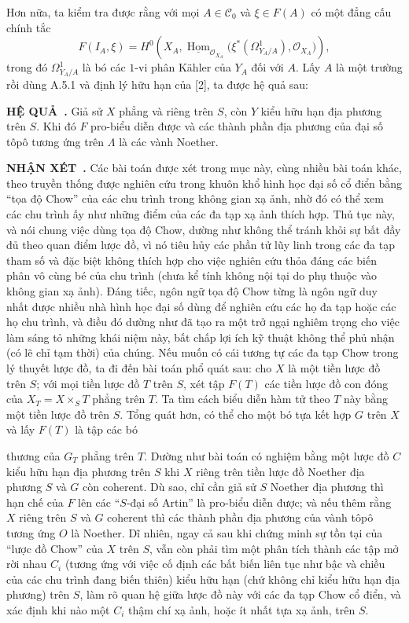 \documentclass[11pt,twoside,openany]{book}
\numberwithin{equation}{section}
\newcommand{\src}[1]{%
  \phantomsection\hypertarget{src:\fgasourceid:#1}{}%
  \marginpar{\raggedleft\footnotesize\sffamily #1}%
}
\newcommand{\fgasourceid}{unset}
\newcommand{\result}[2]{\par\medskip\noindent\textbf{#1\if\relax\detokenize{#2}\relax\else\ #2\fi.}\quad}
\begin{document}
Hơn nữa, ta kiểm tra được rằng với mọi $A\in\mathcal C_0$ và $\xi\in F(A)$ có
một đẳng cấu chính tắc
\[
  F(I_A,\xi)=H^0\!\left(
    X_A,
    \underline{\operatorname{Hom}}_{\mathcal O_{X_A}}
    \bigl(\xi^*(\Omega^1_{Y_A/A}),\mathcal O_{X_A}\bigr)
  \right),
\]
trong đó $\Omega^1_{Y_A/A}$ là bó các $1$-vi phân Kähler của $Y_A$ đối với
$A$. Lấy $A$ là một trường rồi dùng A.5.1 và định lý hữu hạn của [2], ta được
hệ quả sau:

\result{HỆ QUẢ}{} Giả sử $X$ phẳng và riêng trên $S$, còn $Y$ kiểu hữu hạn địa
phương trên $S$. Khi đó $F$ pro-biểu diễn được và các thành phần địa phương của
đại số tôpô tương ứng trên $\Lambda$ là các vành Noether.

\result{NHẬN XÉT}{} Các bài toán được xét trong mục này, cùng nhiều bài toán
khác, theo truyền thống được nghiên cứu trong khuôn khổ hình học đại số cổ điển
bằng ``tọa độ Chow'' của các chu trình trong không gian xạ ảnh, nhờ đó có thể
xem các chu trình ấy như những điểm của các đa tạp xạ ảnh thích hợp. Thủ tục
này, và nói chung việc dùng tọa độ Chow, dường như không thể tránh khỏi sự bất
đầy đủ theo quan điểm lược đồ, vì nó tiêu hủy các phần tử lũy linh trong các đa
tạp tham số và đặc biệt không thích hợp cho việc nghiên cứu thỏa đáng các biến
phân vô cùng bé của chu trình (chưa kể tính không nội tại do phụ thuộc vào
không gian xạ ảnh). Đáng tiếc, ngôn ngữ tọa độ Chow từng là ngôn ngữ duy nhất
được nhiều nhà hình học đại số dùng để nghiên cứu các họ đa tạp hoặc các họ
chu trình, và điều đó dường như đã tạo ra một trở ngại nghiêm trọng cho việc
làm sáng tỏ những khái niệm này, bất chấp lợi ích kỹ thuật không thể phủ nhận
(có lẽ chỉ tạm thời) của chúng. Nếu muốn có cái tương tự các đa tạp Chow trong
lý thuyết lược đồ, ta đi đến bài toán phổ quát sau: cho $X$ là một tiền lược đồ
trên $S$; với mọi tiền lược đồ $T$ trên $S$, xét tập $F(T)$ các tiền lược đồ
con đóng của $X_T=X\times_ST$ phẳng trên $T$. Ta tìm cách biểu diễn hàm tử theo
$T$ này bằng một tiền lược đồ trên $S$. Tổng quát hơn, có thể cho một bó tựa
kết hợp $G$ trên $X$ và lấy $F(T)$ là tập các bó

\src{383}
thương của $G_T$ phẳng trên $T$. Dường như bài toán có nghiệm bằng một lược đồ
$C$ kiểu hữu hạn địa phương trên $S$ khi $X$ riêng trên tiền lược đồ Noether
địa phương $S$ và $G$ còn coherent. Dù sao, chỉ cần giả sử $S$ Noether địa
phương thì hạn chế của $F$ lên các ``$S$-đại số Artin'' là pro-biểu diễn được;
và nếu thêm rằng $X$ riêng trên $S$ và $G$ coherent thì các thành phần địa
phương của vành tôpô tương ứng $O$ là Noether. Dĩ nhiên, ngay cả sau khi chứng
minh sự tồn tại của ``lược đồ Chow'' của $X$ trên $S$, vẫn còn phải tìm một
phân tích thành các tập mở rời nhau $C_i$ (tương ứng với việc cố định các bất
biến liên tục như bậc và chiều của các chu trình đang biến thiên) kiểu hữu hạn
(chứ không chỉ kiểu hữu hạn địa phương) trên $S$, làm rõ quan hệ giữa lược đồ
này với các đa tạp Chow cổ điển, và xác định khi nào một $C_i$ thậm chí xạ ảnh,
hoặc ít nhất tựa xạ ảnh, trên $S$.
\end{document}
